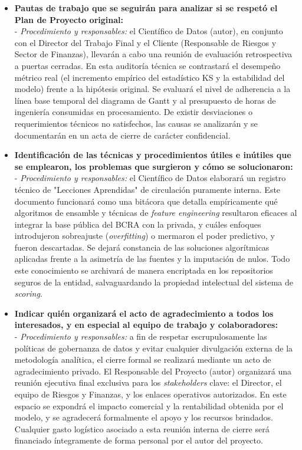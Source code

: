 \documentclass[
11pt, %
]{charter}
\begin{document}
\begin{itemize}
    \item \textbf{Pautas de trabajo que se seguirán para analizar si se respetó el Plan de Proyecto original:} \\
    - \textit{Procedimiento y responsables:} el Científico de Datos (autor), en conjunto con el Director del Trabajo Final y el Cliente (Responsable de Riesgos y Sector de Finanzas), llevarán a cabo una reunión de evaluación retrospectiva a puertas cerradas. En esta auditoría técnica se contrastará el desempeño métrico real (el incremento empírico del estadístico KS y la estabilidad del modelo) frente a la hipótesis original. Se evaluará el nivel de adherencia a la línea base temporal del diagrama de Gantt y al presupuesto de horas de ingeniería consumidas en procesamiento. De existir desviaciones o requerimientos técnicos no satisfechos, las causas se analizarán y se documentarán en un acta de cierre de carácter confidencial.

    \item \textbf{Identificación de las técnicas y procedimientos útiles e inútiles que se emplearon, los problemas que surgieron y cómo se solucionaron:} \\
    - \textit{Procedimiento y responsables:} el Científico de Datos elaborará un registro técnico de "Lecciones Aprendidas" de circulación puramente interna. Este documento funcionará como una bitácora que detalla empíricamente qué algoritmos de ensamble y técnicas de \textit{feature engineering} resultaron eficaces al integrar la base pública del BCRA con la privada, y cuáles enfoques introdujeron sobreajuste (\textit{overfitting}) o mermaron el poder predictivo, y fueron descartadas. Se dejará constancia de las soluciones algorítmicas aplicadas frente a la asimetría de las fuentes y la imputación de nulos. Todo este conocimiento se archivará de manera encriptada en los repositorios seguros de la entidad, salvaguardando la propiedad intelectual del sistema de \textit{scoring}.

    \item \textbf{Indicar quién organizará el acto de agradecimiento a todos los interesados, y en especial al equipo de trabajo y colaboradores:} \\
    - \textit{Procedimiento y responsables:} a fin de respetar escrupulosamente las políticas de gobernanza de datos y evitar cualquier divulgación externa de la metodología analítica, el cierre formal se realizará mediante un acto de agradecimiento privado. El Responsable del Proyecto (autor) organizará una reunión ejecutiva final exclusiva para los \textit{stakeholders} clave: el Director, el equipo de Riesgos y Finanzas, y los enlaces operativos autorizados. En este espacio se expondrá el impacto comercial y la rentabilidad obtenida por el modelo, y se agradecerá formalmente el apoyo y los recursos brindados. Cualquier gasto logístico asociado a esta reunión interna de cierre será financiado íntegramente de forma personal por el autor del proyecto.
\end{itemize}
\end{document}
